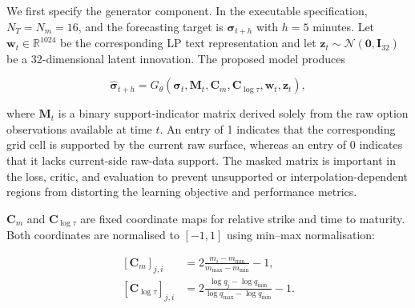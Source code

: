 We first specify the generator component. In the executable specification,
\(N_T=N_m=16\), and the forecasting target is
\(\boldsymbol{\sigma}_{t+h}\) with \(h=5\) minutes. Let
\(\mathbf{w}_t\in\mathbb{R}^{1024}\) be the corresponding LP text
representation and let
\(\mathbf{z}_t\sim\mathcal{N}(\mathbf{0},\mathbf{I}_{32})\) be a 32-dimensional
latent innovation. The proposed model produces


\begin{equation}\label{eq:ch3:generator}
\widehat{\boldsymbol{\sigma}}_{t+h}
=G_{\theta}
\left(
\boldsymbol{\sigma}_t,
\mathbf{M}_t,
\mathbf{C}_{m},
\mathbf{C}_{\log \tau},
\mathbf{w}_t,
\mathbf{z}_t
\right),
\end{equation}

where $\mathbf{M}_t$ is a binary support-indicator matrix derived solely from the raw option observations available at time \(t\). An entry of 1 indicates that the corresponding grid cell is supported by the current raw surface, whereas an entry of 0 indicates that it lacks current-side raw-data support. The masked matrix is important in the loss, critic, and evaluation to prevent unsupported or interpolation-dependent regions from distorting the learning objective and performance metrics.

\(\mathbf{C}_{m}\) and \(\mathbf{C}_{\log \tau}\) are fixed coordinate maps for
relative strike and time to maturity. Both coordinates are normalised to
\([-1,1]\) using min--max normalisation:


\begin{equation}\label{eq:ch3:surface_coordinates}
\begin{aligned}
\left[\mathbf{C}_{m}\right]_{j,i}
&=2\frac{m_i-m_{\min}}{m_{\max}-m_{\min}}-1,\\
[\mathbf{C}_{\log \tau}]_{j,i}
&=2\frac{\log q_j-\log q_{\min}}
{\log q_{\max}-\log q_{\min}}-1.
\end{aligned}
\end{equation}




